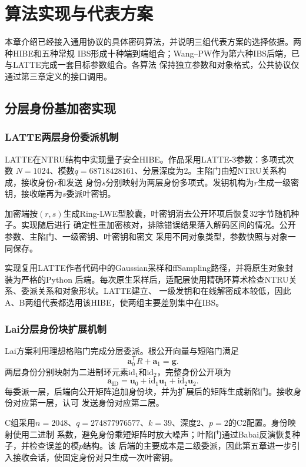 \chapter{算法实现与代表方案}

本章介绍已经接入通用协议的具体密码算法，并说明三组代表方案的选择依据。两种HIBE和五种常规
IBS形成十种端到端组合；Wang--PW作为第六种IBS后端，已与LATTE完成一套目标参数组合。各算法
保持独立参数和对象格式，公共协议仅通过第三章定义的接口调用。

\section{分层身份基加密实现}

\subsection{LATTE两层身份委派机制}

LATTE在NTRU结构中实现量子安全HIBE\cite{zhao2024latte}。作品采用LATTE-3参数：多项式次数
$N=1024$、模数$q=68718428161$、分层深度为2。主陷门由短NTRU关系构成，接收身份$r$和发送
身份$s$分别映射为两层身份多项式。发钥机构为$r$生成一级密钥，接收端再为$s$委派叶密钥。

加密端按$(r,s)$生成Ring-LWE型胶囊，叶密钥消去公开环项后恢复32字节随机种子。实现随后进行
确定性重加密核对，排除错误结果落入解码区间的情况。公开参数、主陷门、一级密钥、叶密钥和密文
采用不同对象类型，参数快照与对象一同保存。

实现复用LATTE作者代码中的Gaussian采样和ffSampling路径，并将原生对象封装为严格的Python
后端。每次原生采样后，适配层使用精确环算术检查NTRU关系、委派关系和对象形状。LATTE建立、
一级发钥和在线解密成本较低，因此A、B两组代表都选用该HIBE，使两组主要差别集中在IBS。

\subsection{Lai分层身份块扩展机制}

Lai方案利用理想格陷门完成分层委派\cite{lai2015trapdoors}。根公开向量与短陷门满足
\[
 \mathbf a_0^{\mathsf T}R+\mathbf a_1=\mathbf g.
\]
两层身份分别映射为二进制环元素$\mathrm{id}_1$和$\mathrm{id}_2$，完整身份公开项为
\[
 \mathbf a_{\mathrm{ID}}
 =\mathbf u_0+\mathrm{id}_1\mathbf u_1+\mathrm{id}_2\mathbf u_2.
\]
每委派一层，后端向公开矩阵追加身份块，并为扩展后的矩阵生成新陷门。接收身份对应第一层，认可
发送身份对应第二层。

C组采用$n=2048$、$q=274877976577$、$k=39$、深度2、$p=2$的C2配置。身份映射使用二进制
系数，避免身份乘短矩阵时放大噪声；叶陷门通过Babai反演恢复种子，并检查误差的模$p$结构。该
后端的主要成本是二级委派，因此第五章进一步引入接收会话，使固定身份对只生成一次叶密钥。

